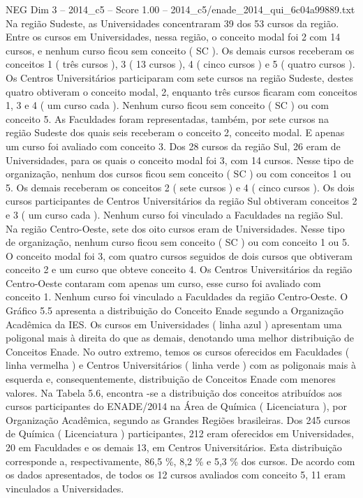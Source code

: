 \begin{textsample}{NEG Dim 3 – 2014\_c5 – Score 1.00 – 2014\_c5/enade\_2014\_qui\_6c04a99889.txt}
Na região Sudeste, as Universidades concentraram 39 dos 53 cursos da região.
Entre os cursos em Universidades, nessa região, o conceito modal foi 2 com 14 cursos, e nenhum curso ficou sem conceito ( SC ).
Os demais cursos receberam os conceitos 1 ( três cursos ), 3 ( 13 cursos ), 4 ( cinco cursos ) e 5 ( quatro cursos ).
Os Centros Universitários participaram com sete cursos na região Sudeste, destes quatro obtiveram o conceito modal, 2, enquanto três cursos ficaram com conceitos 1, 3 e 4 ( um curso cada ).
Nenhum curso ficou sem conceito ( SC ) ou com conceito 5.
As Faculdades foram representadas, também, por sete cursos na região Sudeste dos quais seis receberam o conceito 2, conceito modal.
E apenas um curso foi avaliado com conceito 3.
Dos 28 cursos da região Sul, 26 eram de Universidades, para os quais o conceito modal foi 3, com 14 cursos.
Nesse tipo de organização, nenhum dos cursos ficou sem conceito ( SC ) ou com conceitos 1 ou 5.
Os demais receberam os conceitos 2 ( sete cursos ) e 4 ( cinco cursos ).
Os dois cursos participantes de Centros Universitários da região Sul obtiveram conceitos 2 e 3 ( um curso cada ).
Nenhum curso foi vinculado a Faculdades na região Sul.
Na região Centro-Oeste, sete dos oito cursos eram de Universidades.
Nesse tipo de organização, nenhum curso ficou sem conceito ( SC ) ou com conceito 1 ou 5.
O conceito modal foi 3, com quatro cursos seguidos de dois cursos que obtiveram conceito 2 e um curso que obteve conceito 4.
Os Centros Universitários da região Centro-Oeste contaram com apenas um curso, esse curso foi avaliado com conceito 1.
Nenhum curso foi vinculado a Faculdades da região Centro-Oeste.
O Gráfico 5.5 apresenta a distribuição do Conceito Enade segundo a Organização Acadêmica da IES.
Os cursos em Universidades ( linha azul ) apresentam uma poligonal mais à direita do que as demais, denotando uma melhor distribuição de Conceitos Enade.
No outro extremo, temos os cursos oferecidos em Faculdades ( linha vermelha ) e Centros Universitários ( linha verde ) com as poligonais mais à esquerda e, consequentemente, distribuição de Conceitos Enade com menores valores.
Na Tabela 5.6, encontra -se a distribuição dos conceitos atribuídos aos cursos participantes do ENADE/2014 na Área de Química ( Licenciatura ), por Organização Acadêmica, segundo as Grandes Regiões brasileiras.
Dos 245 cursos de Química ( Licenciatura ) participantes, 212 eram oferecidos em Universidades, 20 em Faculdades e os demais 13, em Centros Universitários.
Esta distribuição corresponde a, respectivamente, 86,5 \%, 8,2 \% e 5,3 \% dos cursos.
De acordo com os dados apresentados, de todos os 12 cursos avaliados com conceito 5, 11 eram vinculados a Universidades.

\end{textsample}
